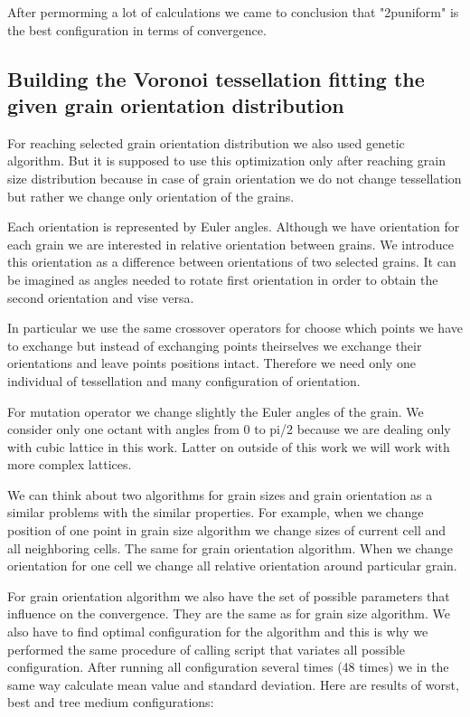 \documentclass{article}
\begin{document}
After permorming a lot of calculations we came to conclusion that "2p\textunderscore uniform" is the best configuration in terms of convergence.

\subsection{Building the Voronoi tessellation fitting the given grain orientation distribution}

For reaching selected grain orientation distribution we also used genetic algorithm. But it is supposed to use this optimization only after reaching grain size distribution because in case of grain orientation we do not change tessellation but rather we change only orientation of the grains.

Each orientation is represented by Euler angles. Although we have orientation for each grain we are interested in relative orientation between grains. We introduce this orientation as a difference between orientations of two selected grains. It can be imagined as angles needed to rotate first orientation in order to obtain the second orientation and vise versa.

In particular we use the same crossover operators for choose which points we have to exchange but instead of exchanging points theirselves we exchange their orientations and leave points positions intact. Therefore we need only one individual of tessellation and many configuration of orientation.

For mutation operator we change slightly the Euler angles of the grain. We consider only one octant with angles from 0 to pi/2 because we are dealing only with cubic lattice in this work. Latter on outside of this work we will work with more complex lattices.

We can think about two algorithms for grain sizes and grain orientation as a similar problems with the similar properties. For example, when we change position of one point in grain size algorithm we change sizes of current cell and all neighboring cells. The same for grain orientation algorithm. When we change orientation for one cell we change all relative orientation around particular grain.

For grain orientation algorithm we also have the set of possible parameters that influence on the convergence. They are the same as for grain size algorithm. We also have to find optimal configuration for the algorithm and this is why we performed the same procedure of calling script that variates all possible configuration. After running all configuration several times (48 times) we in the same way calculate mean value and standard deviation. Here are results of worst, best and tree medium configurations:
\end{document}
